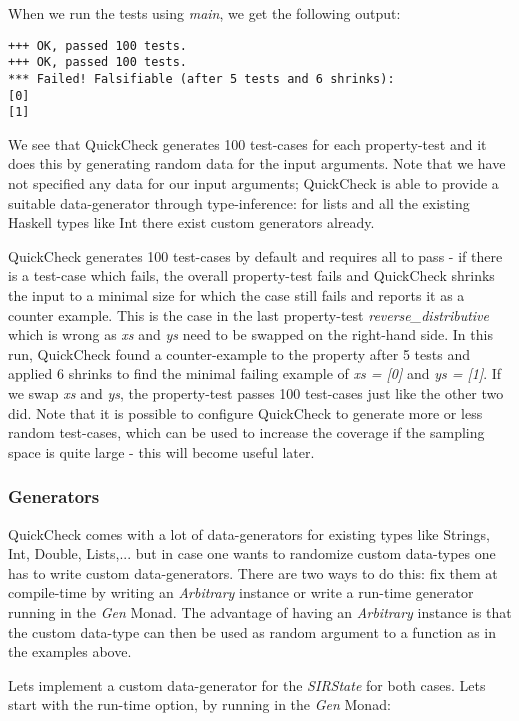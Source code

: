 When we run the tests using \textit{main}, we get the following output:

\begin{verbatim}
+++ OK, passed 100 tests.
+++ OK, passed 100 tests.
*** Failed! Falsifiable (after 5 tests and 6 shrinks):    
[0]
[1]
\end{verbatim}

We see that QuickCheck generates 100 test-cases for each property-test and it does this by generating random data for the input arguments. Note that we have not specified any data for our input arguments; QuickCheck is able to provide a suitable data-generator through type-inference: for lists and all the existing Haskell types like Int there exist custom generators already.

QuickCheck generates 100 test-cases by default and requires all to pass - if there is a test-case which fails, the overall property-test fails and QuickCheck shrinks the input to a minimal size for which the case still fails and reports it as a counter example. This is the case in the last property-test \textit{reverse\_distributive} which is wrong as \textit{xs} and \textit{ys} need to be swapped on the right-hand side. In this run, QuickCheck found a counter-example to the property after 5 tests and applied 6 shrinks to find the minimal failing example of \textit{xs = [0]} and \textit{ys = [1]}. If we swap \textit{xs} and \textit{ys}, the property-test passes 100 test-cases just like the other two did. Note that it is possible to configure QuickCheck to generate more or less random test-cases, which can be used to increase the coverage if the sampling space is quite large - this will become useful later.

\subsubsection*{Generators}
QuickCheck comes with a lot of data-generators for existing types like Strings, Int, Double, Lists,... but in case one wants to randomize custom data-types one has to write custom data-generators. There are two ways to do this: fix them at compile-time by writing an \textit{Arbitrary} instance or write a run-time generator running in the \textit{Gen} Monad. The advantage of having an \textit{Arbitrary} instance is that the custom data-type can then be used as random argument to a function as in the examples above. 

Lets implement a custom data-generator for the \textit{SIRState} for both cases. Lets start with the run-time option, by running in the \textit{Gen} Monad:

